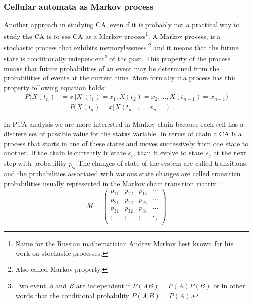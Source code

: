 \subsubsection{Cellular automata as Markov process}
Another approach in studying CA, even if it is probably not a practical
way to study the CA is to see CA as a Markov process\footnote{Name for the
Russian mathematician Andrey Markov best known for his work on stochastic
processes.}. A Markov process, is a stochastic process that exhibits
memorylessness \footnote{Also called Markov property.} and it means that the
future state is conditionally independent\footnote{Two event
\begin{math}A\end{math} and \begin{math}B\end{math} are independent if
\begin{math}P(A B)=P(A)P(B)\end{math} or in other words that the conditional
probability \begin{math}P(A|B)=P(A)\end{math}.} of the past.
This property of the process means that future probabilities of an event may be
determined from the probabilities of events at the current time.
More formally if a process has this property following  equation holds:
\begin{align*}
P(X(t_n)&= x \,| X\,(t_1) = x_1,X(t_2) = x_2, \ldots,X(t_{n-1})=x_{n-1}) \\
&= P(X(t_n)=x | X(t_{n-1}=x_{n-1})
\end{align*}

In PCA analysis we are more interested in Markov chain because each cell has a
discrete set of possible value for the status variable.
In terms of chain a CA is a process that starts in one of these states and moves
successively from one state to another. If the chain is currently in state
\begin{math}s_i\end{math}, than it evolve to state \begin{math}s_j\end{math} at
the next step with probability \begin{math}p_{ij}\end{math}.The changes of state
of the system are called transitions, and the probabilities associated with
various state changes are called transition probabilities usually represented
in the Markov chain transition matrix :
\[
M =
\left( {\begin{array}{cccc}
p_{11} & p_{12} & p_{13} &\cdots \\
p_{21} & p_{12} & p_{23} &\cdots \\
p_{31} & p_{32} & p_{33} &\cdots \\
\vdots & \vdots  &\vdots& \ddots\\
\end{array} } \right)
\]

